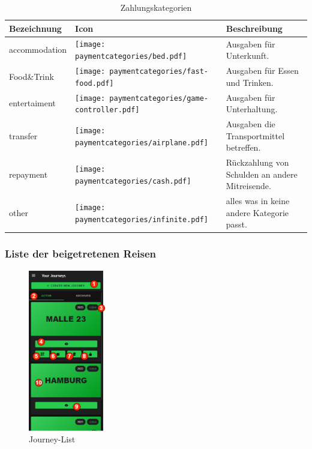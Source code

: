 \begin{table}[H]
	\caption{Zahlungskategorien}
	\begin{tabularx}{0.95\textwidth}{ |X|X|X| }
		\hline
		\rowcolor{gray} \textbf{Bezeichnung} & \textbf{Icon}                                                                 & Beschreibung                                    \\
		\hline
		accommodation                        & \texttt{[image: paymentcategories/bed.pdf]}             &
		Ausgaben für Unterkunft.                                                                                                                                               \\
		\hline
		Food\&Trink                          & \texttt{[image: paymentcategories/fast-food.pdf]}       & Ausgaben für Essen und Trinken.                 \\
		\hline
		entertaiment                         & \texttt{[image: paymentcategories/game-controller.pdf]} & Ausgaben für Unterhaltung.                      \\
		\hline
		transfer                             & \texttt{[image: paymentcategories/airplane.pdf]}        & Ausgaben die Transportmittel betreffen.         \\
		\hline
		repayment                            & \texttt{[image: paymentcategories/cash.pdf]}            & Rückzahlung von Schulden an andere Mitreisende. \\
		\hline
		other                                & \texttt{[image: paymentcategories/infinite.pdf]}        & alles was in keine andere Kategorie passt.      \\
		\hline
	\end{tabularx}
	\label{Tab:paymentcategories}
\end{table}

\subsubsection{Liste der beigetretenen Reisen}\label{Journey-List}
\begin{figure}[H]
	\centering
	\includegraphics[width=0.3\textwidth]{img/pages_numbers/journey-list.drawio}
	\caption[Journey-List]{Journey-List}
	\label{fig:Journey-List}
\end{figure}

